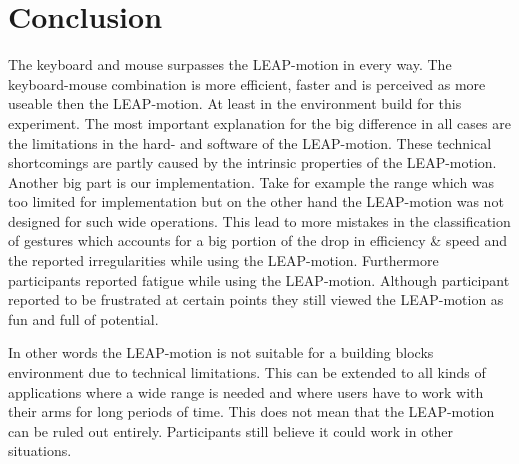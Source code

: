 \section{Conclusion}
The keyboard and mouse surpasses the LEAP-motion in every way. The keyboard-mouse combination is more efficient, faster and is perceived as more useable then the LEAP-motion. At least in the environment build for this experiment. The most important explanation for the big difference in all cases are the limitations in the hard- and software of the LEAP-motion. These technical shortcomings are partly caused by the intrinsic properties of the LEAP-motion. Another big part is our implementation. Take for example the range which was too limited for implementation but on the other hand the LEAP-motion was not designed for such wide operations. This lead to more mistakes in the classification of gestures which accounts for a big portion of the drop in efficiency \& speed and the reported irregularities while using the LEAP-motion. Furthermore participants reported fatigue while using the LEAP-motion. Although participant reported to be frustrated at certain points they still viewed the LEAP-motion as fun and full of potential.  

In other words the LEAP-motion is not suitable for a building blocks environment due to technical limitations. This can be extended to all kinds of applications where a wide range is needed and where users have to work with their arms for long periods of time. This does not mean that the LEAP-motion can be ruled out entirely. Participants still believe it could work in other situations.
